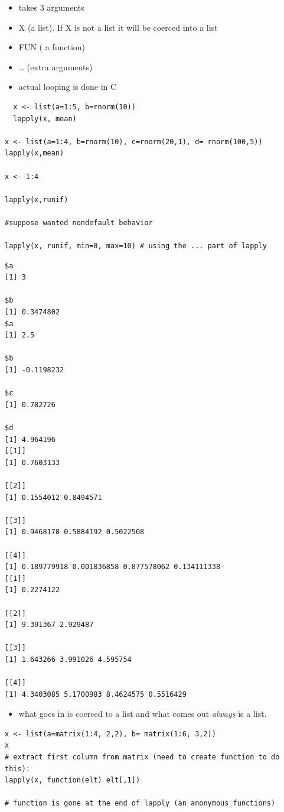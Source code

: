 \documentclass[11pt]{article}
\begin{document}
\begin{itemize}
\item takes 3 arguments
\item X (a list). If X is not a list it will be coerced into a list
\item FUN ( a function)
\item \ldots{} (extra arguments)
\item actual looping is done in C
\end{itemize}


\begin{verbatim}
  x <- list(a=1:5, b=rnorm(10))
  lapply(x, mean)

x <- list(a=1:4, b=rnorm(10), c=rnorm(20,1), d= rnorm(100,5))
lapply(x,mean)

x <- 1:4

lapply(x,runif)

#suppose wanted nondefault behavior

lapply(x, runif, min=0, max=10) # using the ... part of lapply
\end{verbatim}


\begin{verbatim}
$a
[1] 3

$b
[1] 0.3474802
$a
[1] 2.5

$b
[1] -0.1198232

$c
[1] 0.782726

$d
[1] 4.964196
[[1]]
[1] 0.7603133

[[2]]
[1] 0.1554012 0.8494571

[[3]]
[1] 0.9468178 0.5884192 0.5022508

[[4]]
[1] 0.189779918 0.001836858 0.877578062 0.134111338
[[1]]
[1] 0.2274122

[[2]]
[1] 9.391367 2.929487

[[3]]
[1] 1.643266 3.991026 4.595754

[[4]]
[1] 4.3403085 5.1700983 8.4624575 0.5516429
\end{verbatim}

\begin{itemize}
\item what goes in is coerced to a list and what comes out \emph{always} is a
  list.
\end{itemize}


\begin{verbatim}
x <- list(a=matrix(1:4, 2,2), b= matrix(1:6, 3,2))
x
# extract first column from matrix (need to create function to do this):
lapply(x, function(elt) elt[,1])

# function is gone at the end of lapply (an anonymous functions)
\end{verbatim}
\end{document}
